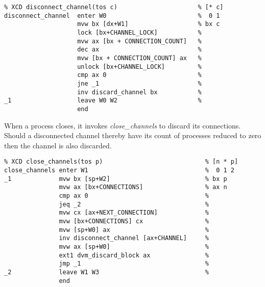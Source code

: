 {\small
\begin{verbatim}
% XCD disconnect_channel(tos c)                      % [* c]
disconnect_channel  enter W0                         %  0 1
                    mvw bx [dx+W1]                   % bx c
                    lock [bx+CHANNEL_LOCK]           %
                    mvw ax [bx + CONNECTION_COUNT]   %
                    dec ax                           %
                    mvw [bx + CONNECTION_COUNT] ax   %
                    unlock [bx+CHANNEL_LOCK]         %
                    cmp ax 0                         %
                    jne _1                           %
                    inv discard_channel bx           %
_1                  leave W0 W2                      %
                    end
\end{verbatim}}

When a process closes, it invokes \emph{close\_channels} to discard its connections. Should a disconnected channel thereby have its count of processes reduced to zero then the channel is also discarded.

\begin{tabbing}
\indents
{}
\fin
\end{tabbing}

{\small
\begin{verbatim}
% XCD close_channels(tos p)                            % [n * p]
close_channels enter W1                                %  0 1 2
_1             mvw bx [sp+W2]                          % bx p
               mvw ax [bx+CONNECTIONS]                 % ax n
               cmp ax 0                                %
               jeq _2                                  %
               mvw cx [ax+NEXT_CONNECTION]             %
               mvw [bx+CONNECTIONS] cx                 %
               mvw [sp+W0] ax                          %
               inv disconnect_channel [ax+CHANNEL]     %
               mvw ax [sp+W0]                          %
               ext1 dvm_discard_block ax               %
               jmp _1                                  %
_2             leave W1 W3                             %
               end
\end{verbatim}}



